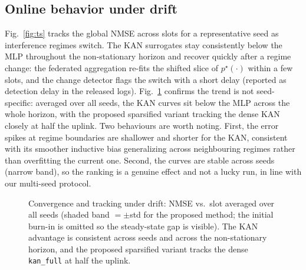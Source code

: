 \documentclass[journal]{IEEEtran}
\newcommand{\pstar}{p^{\star}}
\begin{document}
\subsection{Online behavior under drift}
Fig.~\ref{fig:ts} tracks the global NMSE across slots for a representative seed as
interference regimes switch. The KAN surrogates stay consistently below the MLP
throughout the non-stationary horizon and recover quickly after a regime change:
the federated aggregation re-fits the shifted slice of $\pstar(\cdot)$ within a few
slots, and the change detector flags the switch with a short delay (reported as
detection delay in the released logs). Fig.~\ref{fig:conv} confirms the trend is
not seed-specific: averaged over all seeds, the KAN curves sit below the MLP across
the whole horizon, with the proposed sparsified variant tracking the dense KAN
closely at half the uplink. Two behaviours are worth noting. First, the error
spikes at regime boundaries are shallower and shorter for the KAN, consistent with
its smoother inductive bias generalizing across neighbouring regimes rather than
overfitting the current one. Second, the curves are stable across seeds (narrow
band), so the ranking is a genuine effect and not a lucky run, in line with our
multi-seed protocol.

\begin{figure}[t]
\centering
{}
\caption{Convergence and tracking under drift: NMSE vs.\ slot averaged over all
seeds (shaded band $=\pm$std for the proposed method; the initial burn-in is
omitted so the steady-state gap is visible). The KAN advantage is consistent across
seeds and across the non-stationary horizon, and the proposed sparsified variant
tracks the dense \texttt{kan\_full} at half the uplink.}
\label{fig:conv}
\end{figure}
\end{document}
